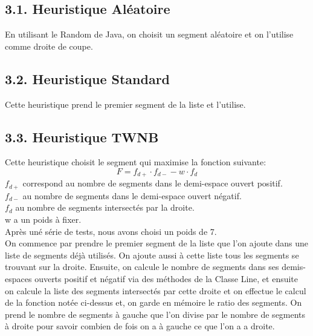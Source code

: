 \documentclass[a4paper,12pt]{report}	%
\begin{document}
    {\subsection*{3.1. Heuristique Aléatoire}}
    En utilisant le Random de Java, on choisit un segment aléatoire et on l'utilise comme droite de coupe. \\
    
    {\subsection*{3.2. Heuristique Standard}}
    Cette heuristique prend le premier segment de la liste et l'utilise.\\
    
    {\subsection*{3.3. Heuristique TWNB}}
    Cette heuristique choisit le segment qui maximise la fonction suivante:
    \begin{equation}
    F = f_{d+} \cdot f_{d-} - w \cdot f_d
    \end{equation}
    $f_{d+}$ correspond au nombre de segments dans le demi-espace ouvert positif.\\
    $f_{d-}$ au nombre de segments dans le demi-espace ouvert négatif.\\
    $f_{d}$ au nombre de segments intersectés par la droite. \\
    w a un poids à fixer. \\
    Après uné série de tests, nous avons choisi un poids de 7.\\

    On commence par prendre le premier segment de la liste que l'on ajoute dans une liste de segments déjà utilisés. On ajoute aussi à cette liste
    tous les segments se trouvant sur la droite. Ensuite, on calcule le nombre de segments dans ses demis-espaces ouverts positif et négatif via
    des méthodes de la Classe Line, et ensuite on calcule la liste des segments intersectés par cette droite et on effectue le calcul de la fonction
    notée ci-dessus et, on garde en mémoire le ratio des segments. On prend le nombre de segments à gauche que l'on divise par le nombre de segments
    à droite pour savoir combien de fois on a à gauche ce que l'on a a droite.\\
\end{document}
